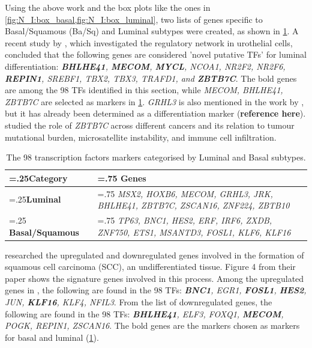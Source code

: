 Using the above work and the box plots like the ones in \cref{fig:N_I:box_basal,fig:N_I:box_luminal}, two lists of genes specific to Basal/Squamous (Ba/Sq) and Luminal subtypes were created, as shown in \cref{tab:N_I:genes_lum_basal}. A recent study by \citet{Ramal2024-ha}, which investigated the regulatory network in urothelial cells, concluded that the following genes are considered 'novel putative TFs' for luminal differentiation: \textit{\textbf{BHLHE41}, \textbf{MECOM}, \textbf{MYCL}, NCOA1, NR2F2, NR2F6, \textbf{REPIN1}, SREBF1, TBX2, TBX3, TRAFD1, and \textbf{ZBTB7C}}. The bold genes are among the 98 TFs identified in this section, while \textit{MECOM, BHLHE41, ZBTB7C} are selected as markers in \cref{tab:N_I:genes_lum_basal}. \textit{GRHL3} is also mentioned in the work by \citet{Ramal2024-ha}, but it has already been determined as a differentiation marker (\textbf{reference here}). \citet{Chen2021-tc} studied the role of \textit{ZBTB7C} across different cancers and its relation to tumour mutational burden, microsatellite instability, and immune cell infiltration.

\begin{table}[H]
  \centering
  \begin{tabularx}{\textwidth}{>{\hsize=.25\hsize}X|>{\hsize=.75\hsize}X}
    \toprule
    \textbf{Category} & \textbf{Genes} \\
    \midrule
    \textbf{Luminal} & \textit{MSX2, HOXB6, MECOM, GRHL3, JRK, BHLHE41, ZBTB7C, ZSCAN16, ZNF224, ZBTB10} \\
    \midrule
    \textbf{Basal/Squamous} & \textit{TP63, BNC1, HES2, ERF, IRF6, ZXDB, ZNF750, ETS1, MSANTD3, FOSL1, KLF6, KLF16} \\
    \bottomrule
  \end{tabularx}
  \caption{The 98 transcription factors markers categorised by Luminal and Basal subtypes.} %
  \label{tab:N_I:genes_lum_basal}
\end{table}

\citet{Hurst2022-sp} researched the upregulated and downregulated genes involved in the formation of squamous cell carcinoma (SCC), an undifferentiated tissue. Figure 4 from their paper shows the signature genes involved in this process. Among the upregulated genes in \citet{Hurst2022-sp}, the following are found in the 98 TFs: \textit{\textbf{BNC1}, EGR1, \textbf{FOSL1}, \textbf{HES2}, JUN, \textbf{KLF16}, KLF4, NFIL3}. From the list of downregulated genes, the following are found in the 98 TFs: \textit{\textbf{BHLHE41}, ELF3, FOXQ1, \textbf{MECOM}, POGK, REPIN1, ZSCAN16}. The bold genes are the markers chosen as markers for basal and luminal (\cref{tab:N_I:genes_lum_basal}).



